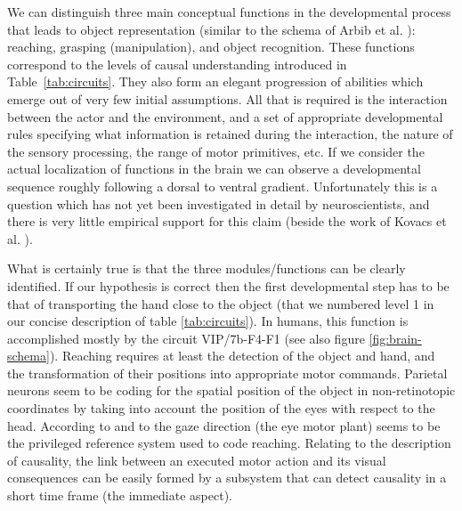 We can distinguish three main conceptual functions in the developmental 
process that leads to object representation (similar to the 
schema of Arbib et al. \cite{arbib-1981}): reaching, grasping (manipulation), and
object recognition. These functions correspond to the levels of causal 
understanding introduced in Table~\ref{tab:circuits}.
They also form an elegant progression of abilities which emerge out
of very few initial assumptions. All that is required is the 
interaction between the actor and the environment, and a set of appropriate
developmental rules specifying what information is retained during the
interaction, the nature of the sensory processing, the range of motor
primitives, etc. 
If we consider the actual localization of functions in the brain
we can observe a developmental sequence roughly following a dorsal to ventral
gradient. Unfortunately this is a question which has not yet been investigated in detail
by neuroscientists, and there is very little empirical support for this claim
(beside the work of Kovacs et al. \cite{kovacs00human}).

%
%

What is certainly true is that the three modules/functions can be 
clearly identified. If our hypothesis is correct then 
the first developmental step has to be that of transporting the hand 
close to the object (that we numbered level 1 in our concise description 
of table \ref{tab:circuits}). 
In humans, this function is accomplished mostly by the
circuit VIP/7b-F4-F1 (see also figure \ref{fig:brain-schema}). 
Reaching requires at least the detection of
the object and hand, and the transformation of their positions into appropriate 
motor commands. Parietal neurons seem to be coding for the spatial
position of the object in non-retinotopic coordinates by taking
into account the position of the eyes with respect to the head. 
According to \cite{pouget-ducom-torri-bavelier-2002} and 
to \cite{flanders-daghestani-berthoz-1999} the 
gaze direction (the eye motor plant) seems to be the privileged
reference system used to code reaching. 
Relating to the description of causality, the link between an executed
motor action and its visual consequences can be easily formed by 
a subsystem that can detect causality in a short time frame (the immediate
aspect).


